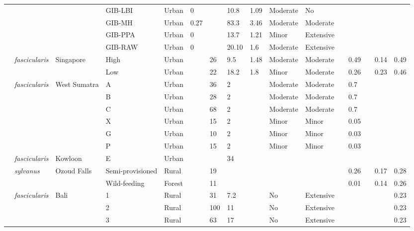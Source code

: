 \documentclass{../../../coursework}
\begin{document}
\begin{landscape}
\begin{longtabu}{XXXXXXXXXXXXXX[0.1]XX}
                    &  &  & GIB-LBI & Urban & 0 &  & 10.8 & 1.09 & Moderate & No &  &  &  &  &  \\
                    &  &  & GIB-MH & Urban & 0.27 &  & 83.3 & 3.46 & Moderate & Moderate &  &  &  &  &  \\
                    &  &  & GIB-PPA & Urban & 0 &  & 13.7 & 1.21 & Minor & Extensive &  &  &  &  &  \\
                    &  &  & GIB-RAW & Urban & 0 &  & 20.10 & 1.6 & Moderate & Extensive &  &  &  &  &  \\
                \hline \textcite{Sha13} & \textit{fascicularis} & Singapore & High & Urban &  & 26 & 9.5 & 1.48 & Moderate & Moderate &  & 0.49 &  & 0.14 & 0.49 \\
                    &  &  & Low & Urban &  & 22 & 18.2 & 1.8 & Minor & Moderate &  & 0.26 &  & 0.23 & 0.46 \\
                \hline \textcite{Ilh17} & \textit{fascicularis} & West Sumatra & A & Urban &  & 36 & 2 &  & Moderate & Moderate &  & 0.7 &  &  &  \\
                    &  &  & B & Urban &  & 28 & 2 &  & Moderate & Moderate &  & 0.7 &  &  &  \\
                    &  &  & C & Urban &  & 68 & 2 &  & Moderate & Moderate &  & 0.7 &  &  &  \\
                    &  &  & X & Urban &  & 15 & 2 &  & Minor & Minor &  & 0.05 &  &  &  \\
                    &  &  & G & Urban &  & 10 & 2 &  & Minor & Minor &  & 0.03 &  &  &  \\
                    &  &  & P & Urban &  & 15 & 2 &  & Minor & Minor &  & 0.03 &  &  &  \\
                \hline \textcite{Won94} & \textit{fascicularis} & Kowloon & E & Urban &  &  & 34 &  &  &  &  &  &  &  &  \\
                \hline \textcite{ElA12} & \textit{sylvanus} & Ozoud Falls & Semi-provisioned & Rural &  & 19 &  &  &  &  &  & 0.26 &  & 0.17 & 0.28 \\
                    &  &  & Wild-feeding & Forest &  & 11 &  &  &  &  &  & 0.01 &  & 0.14 & 0.26 \\
                \hline \textcite{Fue11} & \textit{fascicularis} & Bali & 1 & Rural &  & 31 & 7.2 &  & No & Extensive &  &  &  &  & 0.23 \\
                    &  &  & 2 & Rural &  & 100 & 11 &  & No & Extensive &  &  &  &  & 0.23 \\
                    &  &  & 3 & Rural &  & 63 & 17 &  & No & Extensive &  &  &  &  & 0.23 \\

\end{longtabu}
\end{landscape}
\end{document}
